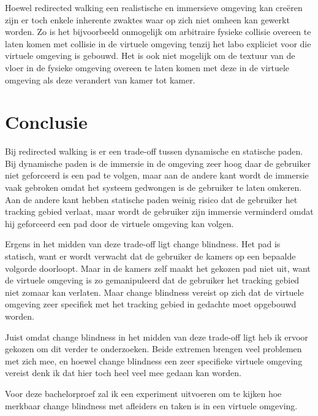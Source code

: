 Hoewel redirected walking een realistische en immersieve omgeving kan cre\"eren 
zijn er toch enkele inherente zwaktes waar op zich niet omheen kan gewerkt 
worden. Zo is het bijvoorbeeld onmogelijk om arbitraire fysieke collisie overeen 
te laten komen met collisie in de virtuele omgeving tenzij het labo expliciet 
voor die virtuele omgeving is gebouwd. Het is ook niet mogelijk om de textuur van
de vloer in de fysieke omgeving overeen te laten komen met deze in de virtuele
omgeving als deze verandert van kamer tot kamer.

%
%


\section{Conclusie}
Bij redirected walking is er een trade-off tussen dynamische en statische paden.
Bij dynamische paden is de immersie in de omgeving zeer hoog daar de gebruiker
niet geforceerd is een pad te volgen, maar aan de andere kant wordt de immersie
vaak gebroken omdat het systeem gedwongen is de gebruiker te laten omkeren. Aan 
de andere kant hebben statische paden weinig risico dat de gebruiker het
tracking gebied verlaat, maar wordt de gebruiker zijn immersie verminderd omdat
hij geforceerd een pad door de virtuele omgeving kan volgen.

Ergens in het midden van deze trade-off ligt change blindness. Het pad is 
statisch, want er wordt verwacht dat de gebruiker de kamers op een bepaalde
volgorde doorloopt. Maar in de kamers zelf maakt het gekozen pad niet uit, want
de virtuele omgeving is zo gemanipuleerd dat de gebruiker het tracking gebied
niet zomaar kan verlaten. Maar change blindness vereist op zich dat de virtuele
omgeving zeer specifiek met het tracking gebied in gedachte moet opgebouwd 
worden.

Juist omdat change blindness in het midden van deze trade-off ligt heb ik ervoor
gekozen om dit verder te onderzoeken. Beide extremen brengen veel problemen met
zich mee, en hoewel change blindness een zeer specifieke virtuele omgeving
vereist denk ik dat hier toch heel veel mee gedaan kan worden.

Voor deze bachelorproef zal ik een experiment uitvoeren om te kijken hoe 
merkbaar change blindness met afleiders en taken is in een virtuele omgeving.